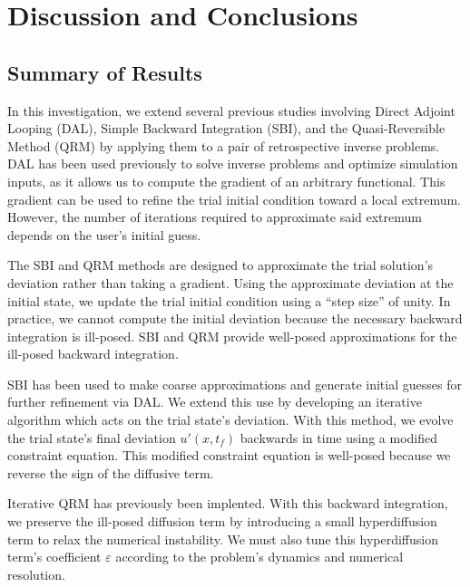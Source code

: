 \documentclass[%
 reprint,
 amsmath,amssymb,
 aps,
 pre,
]{revtex4-2}
\begin{document}
\section{Discussion and Conclusions}
\label{secCon}
\subsection{Summary of Results}
\label{secConSummary}
In this investigation, we extend several previous studies involving Direct Adjoint Looping (DAL), Simple Backward Integration (SBI), and the Quasi-Reversible Method (QRM) by applying them to a pair of retrospective inverse problems. 
DAL has been used previously to solve inverse problems and optimize simulation inputs, as it allows us to compute the gradient of an arbitrary functional.
This gradient can be used to refine the trial initial condition toward a local extremum.
However, the number of iterations required to approximate said extremum depends on the user's initial guess.

The SBI and QRM methods are designed to approximate the trial solution's deviation rather than taking a gradient.
Using the approximate deviation at the initial state, we update the trial initial condition using a ``step size'' of unity.
In practice, we cannot compute the initial deviation because the necessary backward integration is ill-posed.
SBI and QRM provide well-posed approximations for the ill-posed backward integration.

SBI has been used to make coarse approximations and generate initial guesses for further refinement via DAL.
We extend this use by developing an iterative algorithm which acts on the trial state's deviation.
With this method, we evolve the trial state's final deviation $u'(x,t_f)$ backwards in time using a modified constraint equation.
This modified constraint equation is well-posed because we reverse the sign of the diffusive term.

Iterative QRM has previously been implented.
With this backward integration, we preserve the ill-posed diffusion term by introducing a small hyperdiffusion term to relax the numerical instability.
We must also tune this hyperdiffusion term's coefficient $\varepsilon$ according to the problem's dynamics and numerical resolution.
\end{document}
